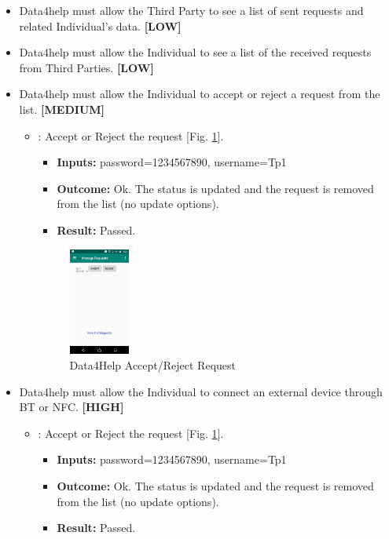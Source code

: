 \documentclass[a4paper, hidelinks, 12pt]{report}
\newcommand\requirement[1]{\item[{[REQ-#1]}] }
\newcommand\test[1]{\item[{[TEST-#1]}] }
\begin{document}
\begin{itemize}
\begin{itemize}
	\end{itemize}

	\requirement{14} Data4help must allow the Third Party to see a list of sent requests and related Individual’s data. \textbf{[LOW]}
	\requirement{15} Data4help must allow the Individual to see a list of the received requests from Third Parties. \textbf{[LOW]}
	\requirement{16} Data4help must allow the Individual to accept or reject a request from the list. \textbf{[MEDIUM]}
			
				\begin{itemize}
		\test{13}: Accept or Reject the request [Fig. \ref{fig:request_acceptreject}].
			\begin{itemize}
			\item \textbf{Inputs: } password=1234567890, username=Tp1			
			\item \textbf{Outcome: } Ok. The status is updated and the request is removed from the list (no update options).
			\item \textbf{Result: } Passed. 
			\end{itemize}		
			
		\begin{figure}[H]
					\centering
				\includegraphics[width=0.2\textwidth]{images/manage_requests.jpeg}
					\caption[Data4Help Accept/Reject Request]{Data4Help Accept/Reject Request}
				\label{fig:request_acceptreject}
			\end{figure}

	\end{itemize}
	
	\requirement{17} Data4help must allow the Individual to connect an external device through BT or NFC. \textbf{[HIGH]}
	\begin{itemize}
		\test{13}: Accept or Reject the request [Fig. \ref{fig:request_acceptreject}].
			\begin{itemize}
			\item \textbf{Inputs: } password=1234567890, username=Tp1			
			\item \textbf{Outcome: } Ok. The status is updated and the request is removed from the list (no update options).
			\item \textbf{Result: } Passed. 
			\end{itemize}
	\end{itemize}
	\end{itemize}
\end{document}
